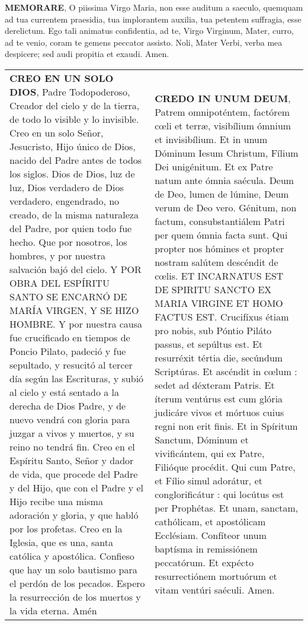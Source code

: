 \documentclass[./rosary.tex]{subfiles}
\begin{document}
\bigskip

\label{sec:memorare}
\textbf{MEMORARE}, O piissima Virgo Maria, non esse auditum a saeculo, quemquam ad tua currentem praesidia, tua implorantem auxilia, 
tua petentem suffragia, esse derelictum. Ego tali animatus confidentia, ad te, Virgo Virginum, Mater, curro, ad te venio, coram te gemens 
peccator assisto. Noli, Mater Verbi, verba mea despicere; sed audi propitia et exaudi. Amen.

\label{sec:creed-nicene}
\begin{longtable} { p{} p{} }
    \textbf{CREO EN UN SOLO DIOS}, Padre Todopoderoso, Creador del cielo y de la tierra, de todo lo visible y lo invisible. 
    Creo en un solo Señor, Jesucristo, Hijo único de Dios, nacido del Padre antes de todos los siglos. Dios de Dios, luz de luz, 
    Dios verdadero de Dios verdadero, engendrado, no creado, de la misma naturaleza del Padre, por quien todo fue hecho. Que por nosotros, los hombres, 
    y por nuestra salvación bajó del cielo. Y POR OBRA DEL ESPÍRITU SANTO SE ENCARNÓ DE MARÍA VIRGEN, Y SE HIZO HOMBRE. 
    Y por nuestra causa fue crucificado en tiempos de Poncio Pilato, padeció y fue sepultado, y resucitó al tercer día según las Escrituras, 
    y subió al cielo y está sentado a la derecha de Dios Padre, y de nuevo vendrá con gloria para juzgar a vivos y muertos, y su reino no tendrá fin. 
    Creo en el Espíritu Santo, Señor y dador de vida, que procede del Padre y del Hijo, que con el Padre y el Hijo recibe una misma adoración y gloria, 
    y que habló por los profetas. Creo en la Iglesia, que es una, santa católica y apostólica. Confieso que hay un solo bautismo para el perdón de los pecados. 
    Espero la resurrección de los muertos y la vida eterna. Amén

     &

    \textbf{CREDO IN UNUM DEUM}, Patrem omnipoténtem, factórem cœli et terræ, visibílium ómnium et invisibílium.
    Et in unum Dóminum Iesum Christum, Fílium Dei unigénitum. Et ex Patre natum ante ómnia saécula. Deum de Deo, lumen de lúmine, Deum verum de Deo vero.
    Génitum, non factum, consubstantiálem Patri per quem ómnia facta sunt. Qui propter nos hómines et propter nostram salútem descéndit de cœlis.
    ET INCARNATUS EST DE SPIRITU SANCTO EX MARIA VIRGINE ET HOMO FACTUS EST. Crucifíxus étiam pro nobis, sub Póntio Piláto passus, et sepúltus est.
    Et resurréxit tértia die, secúndum Scriptúras. Et ascéndit in cœlum : sedet ad déxteram Patris. Et íterum ventúrus est cum glória judicáre vivos et mórtuos cuius regni non erit finis.
    Et in Spíritum Sanctum, Dóminum et vivificántem, qui ex Patre, Filióque procédit. Qui cum Patre, et Fílio simul adorátur, et conglorificátur : qui locútus est per Prophétas.
    Et unam, sanctam, cathólicam, et apostólicam Ecclésiam. Confíteor unum baptísma in remissiónem peccatórum. Et expécto resurrectiónem mortuórum et vitam ventúri saéculi. Amen.
\end{longtable}
\end{document}
